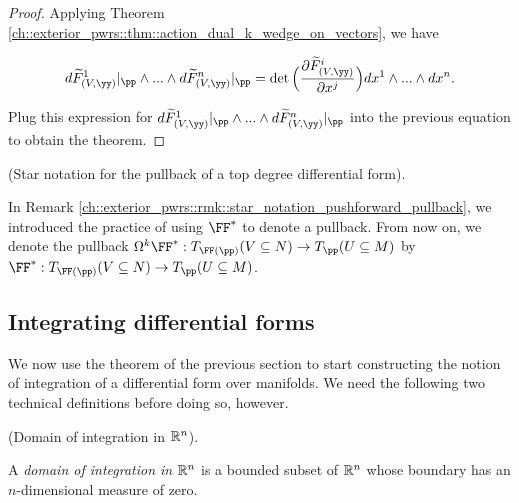 \begin{proof}
    
    Applying Theorem \ref{ch::exterior_pwrs::thm::action_dual_k_wedge_on_vectors}, we have
    
    \begin{align*}
        d\tF_{(V, \yy)}^1|_\pp \wedge ... \wedge d\tF_{(V, \yy)}^n|_\pp = \det\Big(\frac{\pd \tF_{(V, \yy)}^i}{\pd x^j} \Big) dx^1 \wedge ... \wedge dx^n.
    \end{align*}
    
    Plug this expression for $d\tF_{(V, \yy)}^1|_\pp \wedge ... \wedge d\tF_{(V, \yy)}^n|_\pp$ into the previous equation to obtain the theorem.
\end{proof}

\begin{remark}
\label{ch::diff_forms::rmk::pullback_star_notation}
    (Star notation for the pullback of a top degree differential form).
    
    In Remark \ref{ch::exterior_pwrs::rmk::star_notation_pushforward_pullback}, we introduced the practice of using $\FF^*$ to denote a pullback. From now on, we denote the pullback $\Omega^k \FF^*:T_{\FF(\pp)}(V \subseteq N) \rightarrow T_\pp(U \subseteq M)$ by $\FF^*:T_{\FF(\pp)}(V \subseteq N) \rightarrow T_\pp(U \subseteq M)$.
\end{remark}

\subsection*{Integrating differential forms}

We now use the theorem of the previous section to start constructing the notion of integration of a differential form over manifolds. We need the following two technical definitions before doing so, however.

\begin{defn}
     (Domain of integration in $\mathbb{R}^n$).
    
    A \textit{domain of integration in $\mathbb{R}^n$} is a bounded subset of $\mathbb{R}^n$ whose boundary has an $n$-dimensional measure of zero.
\end{defn}

